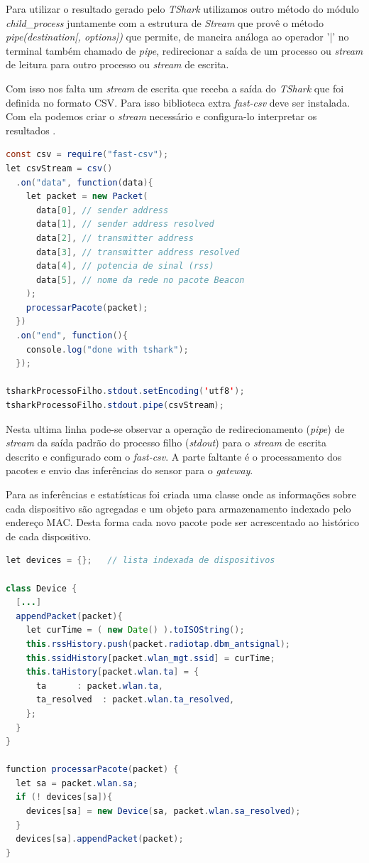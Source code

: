 Para utilizar o resultado gerado pelo \emph{TShark} utilizamos outro método do
módulo \emph{child\_process} juntamente com a estrutura de \emph{Stream}
\cite{stream} que provê o método \emph{pipe(destination[, options])} que permite,
de maneira análoga ao operador '|' no terminal também chamado de \emph{pipe},
redirecionar a saída de um processo ou \emph{stream} de leitura para outro
processo ou \emph{stream} de escrita.

Com isso nos falta um \emph{stream} de escrita que receba a saída do
\emph{TShark} que foi definida no formato CSV. Para isso biblioteca extra
\emph{fast-csv} deve ser instalada. Com ela podemos criar o \emph{stream}
necessário e configura-lo interpretar os resultados \cite{fast-csv}.

\begin{lstlisting}[language=java]
const csv = require("fast-csv");
let csvStream = csv()
  .on("data", function(data){
    let packet = new Packet(
      data[0], // sender address
      data[1], // sender address resolved
      data[2], // transmitter address
      data[3], // transmitter address resolved
      data[4], // potencia de sinal (rss)
      data[5], // nome da rede no pacote Beacon
    );
    processarPacote(packet);
  })
  .on("end", function(){
    console.log("done with tshark");
  });

tsharkProcessoFilho.stdout.setEncoding('utf8');
tsharkProcessoFilho.stdout.pipe(csvStream);
\end{lstlisting}

Nesta ultima linha pode-se observar a operação de redirecionamento (\emph{pipe})
de \emph{stream} da saída padrão do processo filho (\emph{stdout}) para o
\emph{stream} de escrita descrito e configurado com o \emph{fast-csv}. A parte
faltante é o processamento dos pacotes e envio das inferências do sensor para o
\emph{gateway}.

Para as inferências e estatísticas foi criada uma classe onde as informações
sobre cada dispositivo são agregadas e um objeto para armazenamento indexado
pelo endereço MAC. Desta forma cada novo pacote pode ser acrescentado ao
histórico de cada dispositivo.

\begin{lstlisting}[language=java]
let devices = {};	// lista indexada de dispositivos

class Device {
  [...]
  appendPacket(packet){
    let curTime = ( new Date() ).toISOString();
    this.rssHistory.push(packet.radiotap.dbm_antsignal);
    this.ssidHistory[packet.wlan_mgt.ssid] = curTime;
    this.taHistory[packet.wlan.ta] = {
      ta      : packet.wlan.ta,
      ta_resolved  : packet.wlan.ta_resolved,
    };
  }
}

function processarPacote(packet) {
  let sa = packet.wlan.sa;
  if (! devices[sa]){
    devices[sa] = new Device(sa, packet.wlan.sa_resolved);
  }
  devices[sa].appendPacket(packet);
}
\end{lstlisting}

